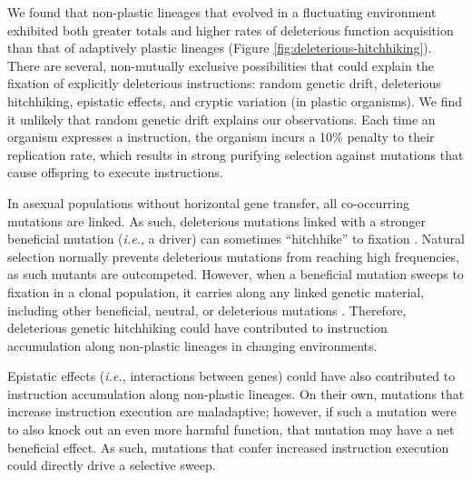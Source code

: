 \documentclass[utf8]{frontiersSCNS} %
\begin{document}
\begin{raggedbottom}
We found that non-plastic lineages that evolved in a fluctuating environment exhibited both greater totals and higher rates of deleterious function acquisition than that of adaptively plastic lineages (Figure \ref{fig:deleterious-hitchhiking}).
There are several, non-mutually exclusive possibilities that could explain the fixation of explicitly deleterious instructions: random genetic drift, deleterious hitchhiking, epistatic effects, and cryptic variation (in plastic organisms).
We find it unlikely that random genetic drift explains our observations.
Each time an organism expresses a  instruction, the organism incurs a 10\% penalty to their replication rate, which results in strong purifying selection against mutations that cause offspring to execute  instructions.

In asexual populations without horizontal gene transfer, all co-occurring mutations are linked.
As such, deleterious mutations linked with a stronger beneficial mutation (\textit{i.e.}, a driver) can sometimes ``hitchhike'' to fixation \citep{smith_hitch-hiking_1974,van_den_bergh_experimental_2018,buskirk_hitchhiking_2017}.
Natural selection normally prevents deleterious mutations from reaching high frequencies, as such mutants are outcompeted.
However, when a beneficial mutation sweeps to fixation in a clonal population, it carries along any linked genetic material, including other beneficial, neutral, or deleterious mutations \citep{barton_genetic_2000, smith_hitch-hiking_1974}.
Therefore, deleterious genetic hitchhiking could have contributed to  instruction accumulation along non-plastic lineages in changing environments.

Epistatic effects (\textit{i.e.}, interactions between genes) could have also contributed to  instruction accumulation along non-plastic lineages. 
On their own, mutations that increase  instruction execution are maladaptive; however, if such a mutation were to also knock out an even more harmful function, that mutation may have a net beneficial effect.
As such, mutations that confer increased  instruction execution could directly drive a selective sweep. 


\end{raggedbottom}
\end{document}
